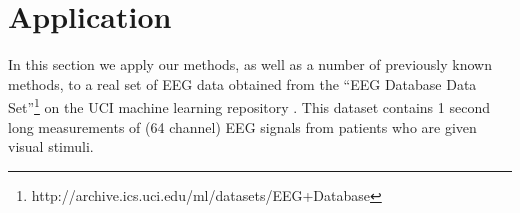 \documentclass[12pt]{article}
\begin{document}


\section{Application}
\label{sec:application}
In this section we apply our methods, as well as a number of
previously known methods, to a real set of EEG data obtained from the
``EEG Database Data
Set''\footnote{http://archive.ics.uci.edu/ml/datasets/EEG+Database}
\cite{zhang1995event} on the UCI machine learning repository
\cite{uci_mlr}.  This dataset contains 1 second long measurements of
(64 channel) EEG signals from patients who are given visual stimuli.
\end{document}
